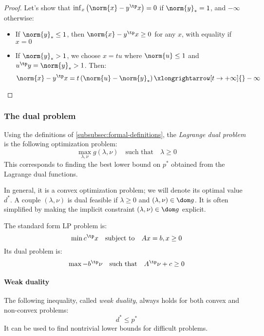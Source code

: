 \begin{proof}
    Let's show that $\inf_x\left(\norm{x}-y^\tp x\right)=0$ if $\norm{y}_*=1$, and $-\infty$ otherwise:
    \begin{itemize}
        \item If $\norm{y}_*\leq1$, then $\norm{x}-y^\tp x\geq 0$ for any $x$, with equality if $x=0$
        \item If $\norm{y}_*>1$, we choose $x=tu$ where $\norm{u}\leq1$ and $u^\tp y=\norm{y}_*>1$. Then:
        \begin{equation*}
            \norm{x} - y^\tp x = t\left(\norm{u}-\norm{y}_*\right) \xlongrightarrow[t\to+\infty]{}-\infty
        \end{equation*}
    \end{itemize}
\end{proof}

\subsubsection{The dual problem}
\begin{definition}
    Using the definitions of \ref{subsubsec:formal-definitions}, the \emph{Lagrange dual problem} is the following optimization problem:
    \begin{equation}
        \max_{\lambda,\nu} g(\lambda, \nu) \quad\text{such that}\quad \lambda\geq0
    \end{equation}
    This corresponds to finding the best lower bound on $p^*$ obtained from the Lagrange dual functions.
\end{definition}
In general, it is a convex optimization problem; we will denote its optimal value $d^*$. A couple $(\lambda, \nu)$ is dual feasible if $\lambda\geq0$ and $(\lambda, \nu)\in\dom g$. It is often simplified by making the implicit constraint $(\lambda,\nu)\in\dom g$ explicit.

\begin{example}
    The standard form LP problem is:
    \begin{equation*}
        \min c^\tp x \quad\text{subject to}\quad Ax=b, x\geq0
    \end{equation*}
   Its dual problem is:
    \begin{equation*}
        \max -b^\tp\nu \quad\text{such that}\quad A^\tp\nu+c\geq0
    \end{equation*}
\end{example}

\paragraph*{Weak duality}
The following inequality, called \emph{weak duality}, always holds for both convex and non-convex problems:
\begin{equation*}
    d^*\leq p^*
\end{equation*}
It can be used to find nontrivial lower bounds for difficult problems.

